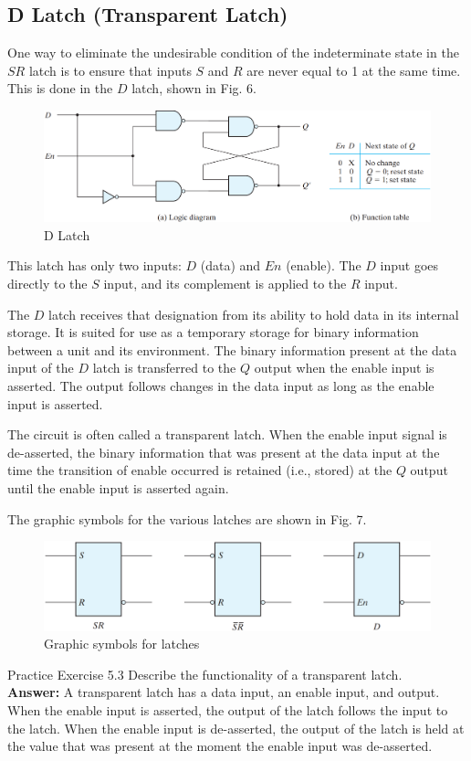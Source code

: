 \subsection{D Latch (Transparent Latch)}
\label{subsec:d-latch}

One way to eliminate the undesirable condition of the indeterminate state in the $SR$ latch is to ensure that inputs $S$ and $R$ are never equal to 1 at the same time. This is done in the $D$ latch, shown in Fig. 6. 
\begin{figure}[H]
  \centering
  \includegraphics[width=\linewidth]{img/fig-5.6.png}
  \caption{D Latch}
  \label{fig:5.6}
\end{figure}
\noindent This latch has only two inputs: $D$ (data) and $En$ (enable). The $D$ input goes directly to the $S$ input, and its complement is applied to the $R$ input. 

The $D$ latch receives that designation from its ability to hold data in its internal storage. It is suited for use as a temporary storage for binary information between a unit and its environment. The binary information present at the data input of the $D$ latch is transferred to the $Q$ output when the enable input is asserted. The output follows changes in the data input as long as the enable input is asserted.

The circuit is often called a transparent latch. When the enable input signal is de-asserted, the binary information that was present at the data input at the time the transition of enable occurred is retained (i.e., stored) at the $Q$ output until the enable input is asserted again.

The graphic symbols for the various latches are shown in Fig. 7.
\begin{figure}[H]
  \centering
  \includegraphics[width=\linewidth]{img/fig-5.7.png}
  \caption{Graphic symbols for latches}
  \label{fig:5.7}
\end{figure}

\begin{practice}{Practice Exercise 5.3}
Describe the functionality of a transparent latch. \\

\textbf{Answer:}
A transparent latch has a data input, an enable input, and output. When the enable input is asserted, the output of the latch follows the input to the latch. When the enable input is de-asserted, the output of the latch is held at the value that was present at the moment the enable input was de-asserted.
\end{practice}
